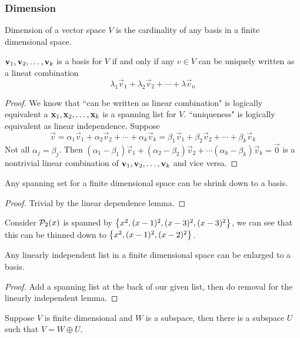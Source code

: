 \subsubsection*{Dimension}
\begin{definition}
    Dimension of a vector space $V$ is the cardinality of any basis in a finite dimensional space.
\end{definition}
\begin{proposition}
    ${\mathbf v}_1,{\mathbf v}_2, \ldots, {\mathbf v}_{k}$ is a basis for $V$ if and only if any $v \in V$ can be uniquely written as a lineat combination
    \[ \lambda_1 \vec v_1 + \lambda_2 \vec v_2 + \cdots + \lambda \vec v_n \]
\end{proposition}
\begin{proof}
    We know that ``can be written  as linear combination" is logically equivalent a ${\mathbf x}_1,{\mathbf x}_2, \ldots, {\mathbf x}_{k}$ is a spanning list for $V$. ``uniqueness" is logically equivalent as linear independence. Suppose
    \[ \vec v = \alpha_1 \vec v_1 + \alpha_2 \vec v_2 + \cdots + \alpha_k \vec v_k = \beta_1 \vec v_1 + \beta_2 \vec v_2 + \cdots + \beta_k \vec v_k\]
    Not all $\alpha_j = \beta_j$. Then $(\alpha_1 -\beta_1) \vec v_1 + (\alpha_2 - \beta_2) \vec v_2 + \cdots (\alpha_k - \beta_k) \vec v_k = \vec 0$ is a nontrivial linear combination of ${\mathbf v}_1,{\mathbf v}_2, \ldots, {\mathbf v}_{k}$ and vice versa. 
\end{proof}
\begin{theorem}
    Any spanning set for a finite dimensional space can be shrink down to a basis.
\end{theorem}
\begin{proof}
    Trivial by the linear dependence lemma.
\end{proof}
\begin{example}
    Consider $\mathcal P_2(x)$ is spanned by $\left\{ x^2, (x-1)^2, (x-3)^2, (x-3)^2\right\}$, we can see that this can be thinned down to $\left\{ x^2, (x-1)^2, (x-2)^2 \right\}$.
\end{example}
\begin{corollary}
    Any linearly independent list in a finite dimensional space can be enlarged to a basis.
\end{corollary}
\begin{proof}
    Add a spanning list at the back of our given list, then do removal for the linearly independent lemma.
\end{proof}
\begin{theorem}
    Suppose $V$ is finite dimensional and $W$ is a subspace, then there is a subspace $U$ such that $V = W \oplus U$.
\end{theorem}
